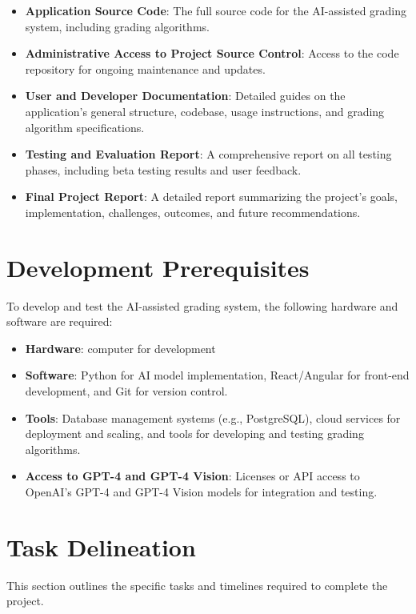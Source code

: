 \documentclass[ms,twoside,print]{nuthesis}
\begin{document}
\begin{itemize}
    \item \textbf{Application Source Code}: The full source code for the AI-assisted grading system, including grading algorithms.
    \item \textbf{Administrative Access to Project Source Control}: Access to the code repository for ongoing maintenance and updates.
    \item \textbf{User and Developer Documentation}: Detailed guides on the application's general structure, codebase, usage instructions, and grading algorithm specifications.
    \item \textbf{Testing and Evaluation Report}: A comprehensive report on all testing phases, including beta testing results and user feedback.
    \item \textbf{Final Project Report}: A detailed report summarizing the project's goals, implementation, challenges, outcomes, and future recommendations.
\end{itemize}

\section{Development Prerequisites}

To develop and test the AI-assisted grading system, the following hardware and software are required:

\begin{itemize}
    \item \textbf{Hardware}: computer for development
    \item \textbf{Software}: Python for AI model implementation, React/Angular for front-end development, and Git for version control.
    \item \textbf{Tools}: Database management systems (e.g., PostgreSQL), cloud services for deployment and scaling, and tools for developing and testing grading algorithms.
    \item \textbf{Access to GPT-4 and GPT-4 Vision}: Licenses or API access to OpenAI's GPT-4 and GPT-4 Vision models for integration and testing.
\end{itemize}

\section{Task Delineation}

This section outlines the specific tasks and timelines required to complete the project.
\end{document}
